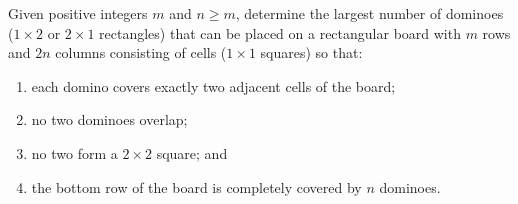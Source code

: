 Given positive integers $m$ and $n \ge m$, determine the largest number of dominoes ($1\times2$ or $2 \times 1$ rectangles) that can be placed on a rectangular board with $m$ rows and $2n$ columns consisting of cells ($1 \times 1$ squares) so that:
\begin{enumerate}[label=(\roman*)]
	\item each domino covers exactly two adjacent cells of the board;
	\item no two dominoes overlap;
	\item no two form a $2 \times 2$ square; and
	\item the bottom row of the board is completely covered by $n$ dominoes.
\end{enumerate}